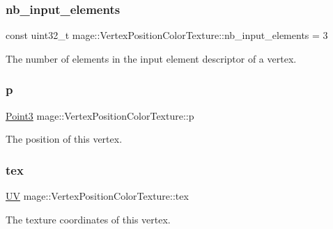 \subsubsection{\texorpdfstring{nb\+\_\+input\+\_\+elements}{nb\_input\_elements}}
{\footnotesize\ttfamily const uint32\+\_\+t mage\+::\+Vertex\+Position\+Color\+Texture\+::nb\+\_\+input\+\_\+elements = 3\hspace{0.3cm}{\ttfamily [static]}}

The number of elements in the input element descriptor of a vertex. \hypertarget{structmage_1_1_vertex_position_color_texture_a145c2e2fce90b07252b778b46e31ea24}{}\label{structmage_1_1_vertex_position_color_texture_a145c2e2fce90b07252b778b46e31ea24} 
\subsubsection{\texorpdfstring{p}{p}}
{\footnotesize\ttfamily \hyperlink{structmage_1_1_point3}{Point3} mage\+::\+Vertex\+Position\+Color\+Texture\+::p}

The position of this vertex. \hypertarget{structmage_1_1_vertex_position_color_texture_adfbaa105e46bb65f502ec33eaa2e8b15}{}\label{structmage_1_1_vertex_position_color_texture_adfbaa105e46bb65f502ec33eaa2e8b15} 
\subsubsection{\texorpdfstring{tex}{tex}}
{\footnotesize\ttfamily \hyperlink{structmage_1_1_u_v}{UV} mage\+::\+Vertex\+Position\+Color\+Texture\+::tex}

The texture coordinates of this vertex. 